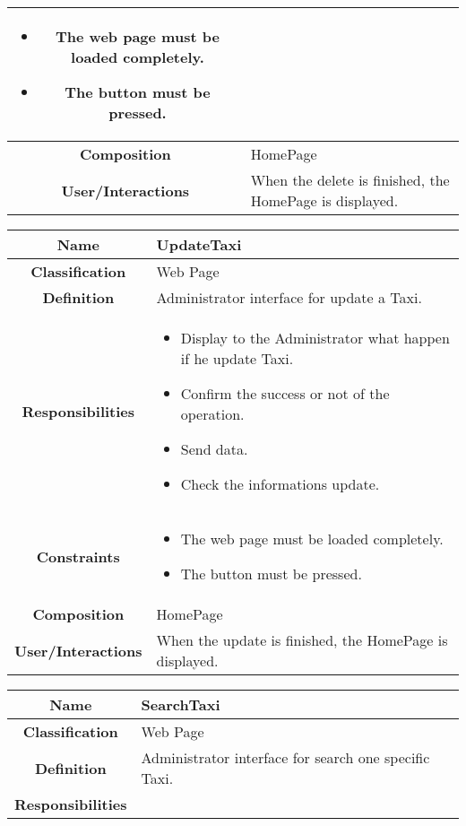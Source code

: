 \documentclass[11pt, a4paper,titlepage]{article}
\begin{document}
\begin{enumerate}
\begin{tabularx}{\textwidth}{| c | X |}
	\begin{itemize}
		\item  The web page must be loaded completely.
		\item The button must be pressed.
	\end{itemize}
	\\
	\hline
	\textbf{Composition} & HomePage
	\\
	\hline
	\textbf{User/Interactions} &
	When the delete is finished, the HomePage is displayed.
	\\
	\hline 
\end{tabularx}
\begin{tabularx}{\textwidth}{| c | X |}
	\hline
	\textbf{Name} &
	UpdateTaxi
	\\
	\hline
	\textbf{Classification} &
	Web Page
	\\
	\hline
	\textbf{Definition} &
	Administrator interface for update a Taxi.\\
	\hline
	\textbf{Responsibilities} &
	\begin{itemize}
		\item Display to the Administrator what happen if he update Taxi.
		\item Confirm the success or not of the operation.
		\item Send data.
		\item Check the informations update.
	\end{itemize}
	\\
	\hline
	\textbf{Constraints} &
	\begin{itemize}
		\item  The web page must be loaded completely.
		\item The button must be pressed.
	\end{itemize}
	\\
	\hline
	\textbf{Composition} & HomePage
	\\
	\hline
	\textbf{User/Interactions} &
	When the update is finished, the HomePage is displayed.
	\\
	\hline 
\end{tabularx}
\begin{tabularx}{\textwidth}{| c | X |}
	\hline
	\textbf{Name} &
	SearchTaxi
	\\
	\hline
	\textbf{Classification} &
	Web Page
	\\
	\hline
	\textbf{Definition} &
	Administrator interface for search one specific Taxi.\\
	\hline
	\textbf{Responsibilities} &
	\begin{itemize}

\end{itemize}
\end{tabularx}
\end{enumerate}
\end{document}
